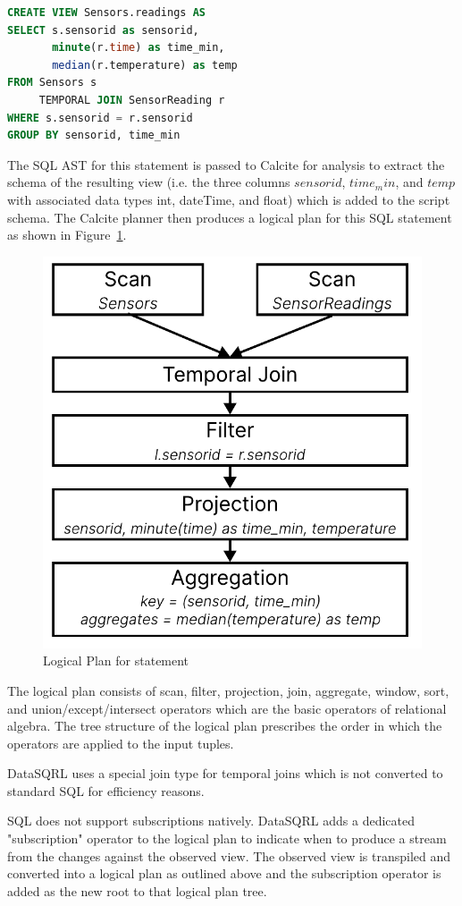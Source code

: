 \documentclass[	DIV=calc,%
							paper=letter,%
							fontsize=11pt,%
							twocolumn]{scrartcl}	 					%
\begin{document}
\begin{lstlisting}[language=SQL]
CREATE VIEW Sensors.readings AS
SELECT s.sensorid as sensorid,
       minute(r.time) as time_min,
       median(r.temperature) as temp
FROM Sensors s
     TEMPORAL JOIN SensorReading r
WHERE s.sensorid = r.sensorid
GROUP BY sensorid, time_min
\end{lstlisting}

The SQL AST for this statement is passed to Calcite for analysis to extract the schema of the resulting view (i.e. the three columns $sensorid$, $time_min$, and $temp$ with associated data types int, dateTime, and float) which is added to the script schema. The Calcite planner then produces a logical plan for this SQL statement as shown in Figure~\ref{fig:local_lp}.

\begin{figure}[h]
\centering
\includegraphics[width=0.7\linewidth]{local_lp.pdf}
\caption{Logical Plan for statement}
\label{fig:local_lp}
\end{figure}

The logical plan consists of scan, filter, projection, join, aggregate, window, sort, and union/except/intersect operators which are the basic operators of relational algebra. The tree structure of the logical plan prescribes the order in which the operators are applied to the input tuples.

DataSQRL uses a special join type for temporal joins which is not converted to standard SQL for efficiency reasons.

SQL does not support subscriptions natively. DataSQRL adds a dedicated "subscription" operator to the logical plan to indicate when to produce a stream from the changes against the observed view. The observed view is transpiled and converted into a logical plan as outlined above and the subscription operator is added as the new root to that logical plan tree.
\end{document}
